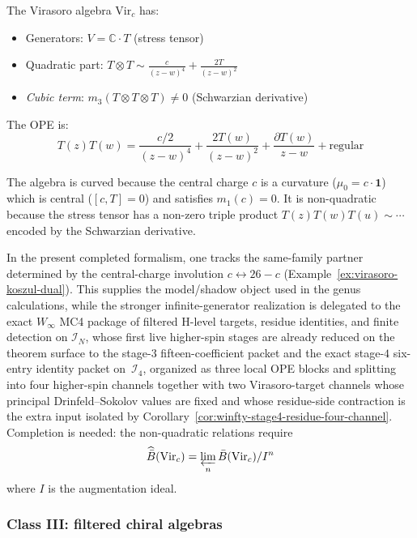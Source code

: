 \begin{example}\label{ex:virasoro-curved}
The Virasoro algebra $\text{Vir}_c$ has:
\begin{itemize}
\item Generators: $V = \mathbb{C} \cdot T$ (stress tensor)
\item Quadratic part: $T \otimes T \sim \frac{c}{(z-w)^4} + \frac{2T}{(z-w)^2}$
\item \emph{Cubic term}: $m_3(T \otimes T \otimes T) \neq 0$ (Schwarzian derivative)
\end{itemize}

The OPE is:
\[T(z)T(w) = \frac{c/2}{(z-w)^4} + \frac{2T(w)}{(z-w)^2} + \frac{\partial T(w)}{z-w} + \text{regular}\]

The algebra is curved because the central charge $c$ is a curvature
($\mu_0 = c \cdot \mathbf{1}$) which is central ($[c, T] = 0$) and
satisfies $m_1(c) = 0$. It is non-quadratic because the stress tensor
has a non-zero triple product $T(z)T(w)T(u) \sim \cdots$ encoded by the
Schwarzian derivative.

In the present completed formalism, one tracks the same-family partner
determined by the central-charge involution
$c \leftrightarrow 26-c$
\textup{(}Example~\textup{\ref{ex:virasoro-koszul-dual}}\textup{)}.
This supplies the model/shadow object used in the genus calculations,
while the stronger infinite-generator realization is delegated to the
exact $W_\infty$ MC4 package of filtered H-level targets, residue
identities, and finite detection on $\mathcal{I}_N$, whose first live
higher-spin stages are already reduced on the theorem surface to the
stage-$3$ fifteen-coefficient packet and the exact stage-$4$ six-entry
identity packet on~$\mathcal{I}_4$, organized as three local OPE blocks
and splitting into four higher-spin channels together with two
Virasoro-target channels whose principal Drinfeld--Sokolov values are
fixed and whose residue-side contraction is the extra input isolated by
Corollary~\ref{cor:winfty-stage4-residue-four-channel}.
Completion is needed: the non-quadratic relations require
\[\widehat{\bar{B}}(\text{Vir}_c) = \varprojlim_n \bar{B}(\text{Vir}_c)/I^n\]
where $I$ is the augmentation ideal.
\end{example}

\subsubsection{Class III: filtered chiral algebras}

